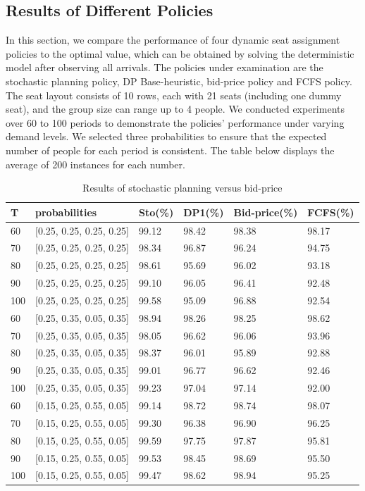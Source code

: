 \subsection{Results of Different Policies}
In this section, we compare the performance of four dynamic seat assignment policies to the optimal value, which can be obtained by solving the deterministic model after observing all arrivals. The policies under examination are the stochastic planning policy, DP Base-heuristic, bid-price policy and FCFS policy. The seat layout consists of 10 rows, each with 21 seats (including one dummy seat), and the group size can range up to 4 people. We conducted experiments over 60 to 100 periods to demonstrate the policies' performance under varying demand levels. We selected three probabilities to ensure that the expected number of people for each period is consistent. The table below displays the average of 200 instances for each number.

\begin{table}[ht]
  \centering
  \caption{Results of stochastic planning versus bid-price}
  \begin{tabular}{|l|l|l|l|l|l|}
  \hline
   T & probabilities & Sto(\%) & DP1(\%) & Bid-price(\%) & FCFS(\%) \\
  \hline
   60  & [0.25, 0.25, 0.25, 0.25]  & 99.12 & 98.42 & 98.38 & 98.17 \\
   70  & [0.25, 0.25, 0.25, 0.25]  & 98.34 & 96.87 & 96.24 & 94.75 \\
   80  & [0.25, 0.25, 0.25, 0.25]  & 98.61 & 95.69 & 96.02 & 93.18 \\
   90  & [0.25, 0.25, 0.25, 0.25]  & 99.10 & 96.05 & 96.41 & 92.48 \\
   100 & [0.25, 0.25, 0.25, 0.25]  & 99.58 & 95.09 & 96.88 & 92.54 \\
   \hline
   60  & [0.25, 0.35, 0.05, 0.35]  & 98.94 & 98.26 & 98.25 & 98.62 \\
   70  & [0.25, 0.35, 0.05, 0.35]  & 98.05 & 96.62 & 96.06 & 93.96 \\
   80  & [0.25, 0.35, 0.05, 0.35]  & 98.37 & 96.01 & 95.89 & 92.88 \\
   90  & [0.25, 0.35, 0.05, 0.35]  & 99.01 & 96.77 & 96.62 & 92.46 \\
   100 & [0.25, 0.35, 0.05, 0.35]  & 99.23 & 97.04 & 97.14 & 92.00 \\
  \hline
  60  & [0.15, 0.25, 0.55, 0.05]  & 99.14 & 98.72 & 98.74 & 98.07 \\
  70  & [0.15, 0.25, 0.55, 0.05]  & 99.30 & 96.38 & 96.90 & 96.25 \\
  80  & [0.15, 0.25, 0.55, 0.05]  & 99.59 & 97.75 & 97.87 & 95.81 \\
  90  & [0.15, 0.25, 0.55, 0.05]  & 99.53 & 98.45 & 98.69 & 95.50 \\
  100 & [0.15, 0.25, 0.55, 0.05]  & 99.47 & 98.62 & 98.94 & 95.25 \\
  \hline
  \end{tabular}
\end{table}

